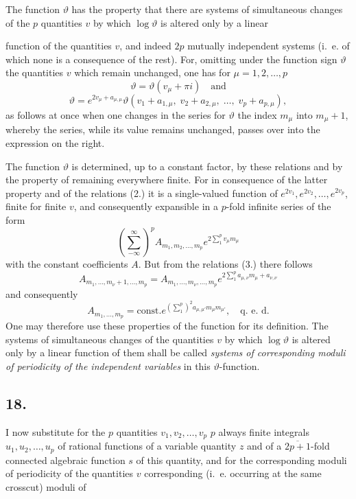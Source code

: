 \documentclass{article}
\begin{document}
The function $\vartheta$ has the property that there are systems of simultaneous changes of the $p$ quantities $v$ by which $\log\vartheta$ is altered only by a linear

function of the quantities $v$, and indeed $2p$ mutually independent systems (i.~e. of which none is a consequence of the rest). For, omitting under the function sign $\vartheta$ the quantities $v$ which remain unchanged, one has for $\mu = 1, 2, \ldots, p$
\[ \vartheta = \vartheta(v_{\mu} + \pi i) \quad \text{and} \tag{2.} \]
\[ \vartheta = e^{2v_{\mu} + a_{\mu,\mu}} \vartheta(v_{1} + a_{1,\mu}, \; v_{2} + a_{2,\mu}, \; \ldots, \; v_{p} + a_{p,\mu}), \tag{3.} \]
as follows at once when one changes in the series for $\vartheta$ the index $m_{\mu}$ into $m_{\mu}+1$, whereby the series, while its value remains unchanged, passes over into the expression on the right.

The function $\vartheta$ is determined, up to a constant factor, by these relations and by the property of remaining everywhere finite. For in consequence of the latter property and of the relations (2.) it is a single-valued function of $e^{2v_{1}}, e^{2v_{2}}, \ldots, e^{2v_{p}}$, finite for finite $v$, and consequently expansible in a $p$-fold infinite series of the form
\[ \left(\sum_{-\infty}^{\infty}\right)^{p} A_{m_{1}, m_{2}, \ldots, m_{p}} e^{2 \sum_{1}^{p} v_{\mu} m_{\mu}} \]
with the constant coefficients $A$. But from the relations (3.) there follows
\[ A_{m_{1}, \ldots, m_{\nu}+1, \ldots, m_{p}} = A_{m_{1}, \ldots, m_{\nu}, \ldots, m_{p}} e^{2 \sum_{1}^{p} a_{\mu,\nu} m_{\mu} + a_{\nu,\nu}} \]
and consequently
\[ A_{m_{1}, \ldots, m_{p}} = \text{const.} e^{\left(\sum_{1}^{p}\right)^{2} a_{\mu,\mu'} m_{\mu} m_{\mu'}}, \quad \text{q.~e.~d.} \]
One may therefore use these properties of the function for its definition. The systems of simultaneous changes of the quantities $v$ by which $\log\vartheta$ is altered only by a linear function of them shall be called \emph{systems of corresponding moduli of periodicity of the independent variables} in this $\vartheta$-function.

\subsection*{18.}

I now substitute for the $p$ quantities $v_{1}, v_{2}, \ldots, v_{p}$ $p$ always finite integrals $u_{1}, u_{2}, \ldots, u_{p}$ of rational functions of a variable quantity $z$ and of a $\overline{2p+1}$-fold connected algebraic function $s$ of this quantity, and for the corresponding moduli of periodicity of the quantities $v$ corresponding (i.~e. occurring at the same crosscut) moduli of
\end{document}
